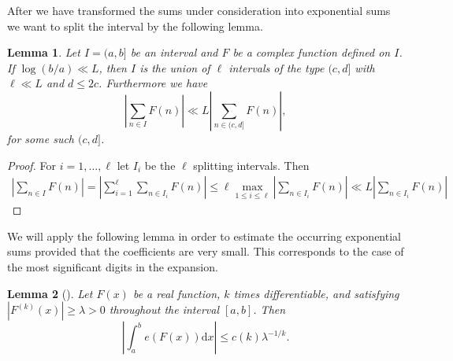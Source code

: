 \documentclass[a4paper,10pt]{amsart}
\newtheorem{lem}{Lemma}[section]
\numberwithin{equation}{section}
\theoremstyle{definition}
\theoremstyle{remark}
\renewcommand{\lvert}{\left\vert}
\renewcommand{\rvert}{\right\vert}
\begin{document}
After we have transformed the sums under consideration into exponential sums
we want to split the interval by the following lemma.
\begin{lem}\label{lem:intervalsplit}
Let $I=(a,b]$ be an interval and $F$ be a complex function defined on $I$. If
$\log(b/a)\ll L$, then $I$ is the union of $\ell$ intervals of the type
$(c,d]$ with $\ell\ll L$ and $d\leq 2c$. Furthermore we have
\[ 
  \lvert\sum_{n\in I}F(n)\rvert\ll L\lvert\sum_{n\in(c,d]}F(n)\rvert,
\]
for some such $(c,d]$.
\end{lem}

\begin{proof}
For $i=1,\ldots,\ell$ let $I_i$ be the $\ell$ splitting intervals. Then
\begin{align*}
\lvert \sum_{n\in I}F(n)\rvert
=\lvert\sum_{i=1}^\ell\sum_{n\in I_i}F(n)\rvert
\leq \ell\max_{1\leq i\leq \ell}\lvert\sum_{n\in I_i}F(n)\rvert\ll
L\lvert\sum_{n\in I_i}F(n)\rvert 
\end{align*}
\end{proof}


We will apply the following lemma in order to estimate the occurring
exponential sums provided that the coefficients are very small. This corresponds to the
case of the most significant digits in the expansion.

\begin{lem}[{\cite[Lemma 4.19]{titchmarsh1986:theory_riemann_zeta}}]
\label{tit:lem4.19}
Let $F(x)$ be a real function, $k$ times differentiable, and satisfying $\lvert
F^{(k)}(x)\rvert\geq\lambda>0$ throughout the interval $[a,b]$. Then
\[
\lvert\int_a^be(F(x))\mathrm{d}x\rvert
\leq c(k)\lambda^{-1/k}.
\]
\end{lem}
\end{document}
